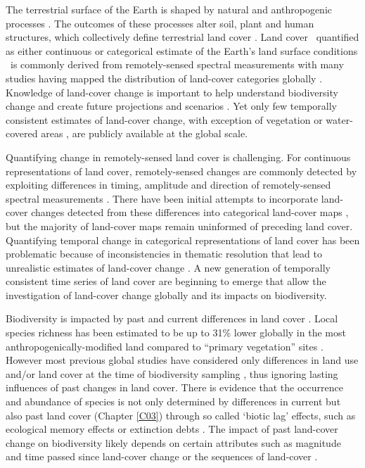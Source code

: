 The terrestrial surface of the Earth is shaped by natural and anthropogenic processes \citep{Foley2005}. The outcomes of these processes alter soil, plant and human structures, which collectively define terrestrial land cover \citep{DiGregorio2000,Lambin2006}. Land cover \textendash\ quantified as either continuous or categorical estimate of the Earth's land surface conditions \textendash\ is commonly derived from remotely-sensed spectral measurements with many studies having mapped the distribution of land-cover categories globally \citep{DeFries1994,Hansen2000,Tuanmu2014,Grekousis2015}. Knowledge of land-cover change is important to help understand biodiversity change and create future projections and scenarios \citep{Harfoot2014,Titeux2016,Kehoe2017a}. Yet only few temporally consistent estimates of land-cover change, with exception of vegetation \citep{Hansen2013,Song2018} or water-covered areas \citep{Pekel2016}, are publicly available at the global scale. 

Quantifying change in remotely-sensed land cover is challenging. For continuous representations of land cover, remotely-sensed changes are commonly detected by exploiting differences in timing, amplitude and direction of remotely-sensed spectral measurements \citep{Coppin2004,Lhermitte2011,Zhu2017}. There have been initial attempts to incorporate land-cover changes detected from these differences into categorical land-cover maps \citep{Zhu2014,Hermosilla2018}, but the majority of land-cover maps remain uninformed of preceding land cover. Quantifying temporal change in categorical representations of land cover has been problematic because of inconsistencies in thematic resolution that lead to unrealistic estimates of land-cover change \citep{VERBURG2011,Cardille2016,Abercrombie2016}. A new generation of temporally consistent time series of land cover \citep{ESA2017,Hermosilla2018,Nowosad2018,Sulla-Menashe2019} are beginning to emerge that allow the investigation of land-cover change globally and its impacts on biodiversity.

Biodiversity is impacted by past and current differences in land cover \citep{Newbold2015,Newbold2016a,Jung2018}. Local species richness has been estimated to be up to 31\% lower globally in the most anthropogenically-modified land compared to “primary vegetation” sites \citep{Newbold2015}. However most previous global studies have considered only differences in land use and/or land cover at the time of biodiversity sampling \citep{Gibson2011,Murphy2014,Newbold2015}, thus ignoring lasting influences of past changes in land cover. There is evidence that the occurrence and abundance of species is not only determined by differences in current but also past land cover (Chapter \ref{C03}) through so called ‘biotic lag’ effects, such as ecological memory effects \citep{Ogle2015} or extinction debts \citep{Kuussaari2009}. The impact of past land-cover change on biodiversity likely depends on certain attributes such as magnitude and time passed since land-cover change \citep[Chapter \ref{C03}, ][]{Martin2013,Watson2014,Fu2017} or the sequences of land-cover \citep{Watson2014,Nowosad2018}. 

